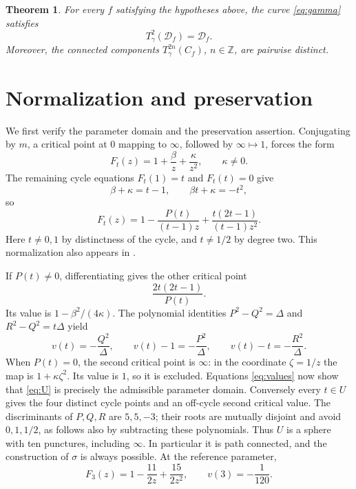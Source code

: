\documentclass[11pt]{article}
\newcommand{\Z}{\mathbb Z}
\newcommand{\D}{\mathcal D}
\newtheorem{theorem}{Theorem}[section]
\theoremstyle{remark}
\begin{document}
\begin{theorem}\label{thm:main}
For every $f$ satisfying the hypotheses above, the curve \eqref{eq:gamma} satisfies
\[
 T_\gamma^2(\D_f)=\D_f.
\]
Moreover, the connected components $T_\gamma^{2n}(C_f)$, $n\in\Z$, are pairwise distinct.
\end{theorem}

\section{Normalization and preservation}
We first verify the parameter domain and the preservation assertion. Conjugating by $m$, a critical point at $0$ mapping to $\infty$, followed by $\infty\mapsto1$, forces the form
\[
 F_t(z)=1+\frac{\beta}{z}+\frac{\kappa}{z^2},\qquad \kappa\ne0.
\]
The remaining cycle equations $F_t(1)=t$ and $F_t(t)=0$ give
\[
 \beta+\kappa=t-1,\qquad \beta t+\kappa=-t^2,
\]
so
\begin{equation}\label{eq:Ft}
 F_t(z)=1-\frac{P(t)}{(t-1)z}
          +\frac{t(2t-1)}{(t-1)z^2}.
\end{equation}
Here $t\ne0,1$ by distinctness of the cycle, and $t\ne1/2$ by degree two. This normalization also appears in \cite[Section 6]{FKS}.

If $P(t)\ne0$, differentiating gives the other critical point
\[
 \frac{2t(2t-1)}{P(t)}.
\]
Its value is $1-\beta^2/(4\kappa)$. The polynomial identities
$P^2-Q^2=\Delta$ and $R^2-Q^2=t\Delta$ yield
\begin{equation}\label{eq:values}
 v(t)=-\frac{Q^2}{\Delta},\qquad
 v(t)-1=-\frac{P^2}{\Delta},\qquad
 v(t)-t=-\frac{R^2}{\Delta}.
\end{equation}
When $P(t)=0$, the second critical point is $\infty$: in the coordinate $\zeta=1/z$ the map is $1+\kappa\zeta^2$. Its value is $1$, so it is excluded. Equations \eqref{eq:values} now show that \eqref{eq:U} is precisely the admissible parameter domain. Conversely every $t\in U$ gives the four distinct cycle points and an off-cycle second critical value. The discriminants of $P,Q,R$ are $5,5,-3$; their roots are mutually disjoint and avoid $0,1,1/2$, as follows also by subtracting these polynomials. Thus $U$ is a sphere with ten punctures, including $\infty$. In particular it is path connected, and the construction of $\sigma$ is always possible. At the reference parameter,
\begin{equation}\label{eq:model}
 F_3(z)=1-\frac{11}{2z}+\frac{15}{2z^2},\qquad v(3)=-\frac1{120}.
\end{equation}
\end{document}
